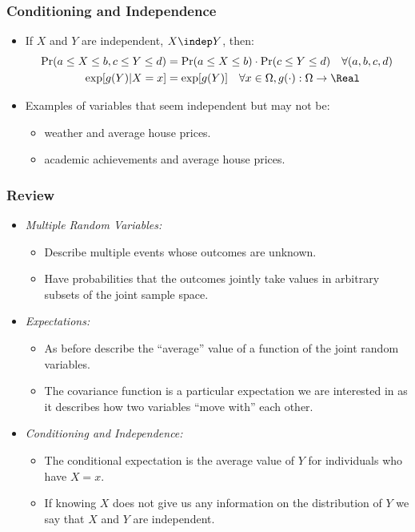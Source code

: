 \begin{frame}
\frametitle{Conditioning and Independence} 
\begin{itemize}
\item If $X$ and $Y$ are independent, $X\indep Y$, then:
\begin{align*}
\Pr(a\leq X\leq b, c\leq Y\leq d) 
  & = \Pr(a\leq X\leq b) \cdot \Pr(c\leq Y\leq d) \quad \forall (a,b,c,d)\\
\exp[g(Y)|X=x] 
  & = \exp[g(Y)] \quad \forall x\in\Omega, g(\cdot):\Omega\to\Real
\end{align*}
\item Examples of variables that seem independent but may not be:
\begin{itemize}
\item weather and average house prices.
\item academic achievements and average house prices.
\end{itemize}
\end{itemize}
\end{frame}


\begin{frame}
\frametitle{Review} 
\begin{itemize}
\item \emph{Multiple Random Variables:}
\begin{itemize}
\item Describe multiple events whose outcomes are unknown.
\item Have probabilities that the outcomes jointly take values in arbitrary subsets of the joint sample space.
\end{itemize}
\item \emph{Expectations:}
\begin{itemize}
\item As before describe the ``average'' value of a function of the joint random variables.
\item The covariance function is a particular expectation we are interested in as it describes how two variables ``move with'' each other.
\end{itemize}
\item \emph{Conditioning and Independence:}
\begin{itemize}
\item The conditional expectation is the average value of $Y$ for individuals who have $X=x$.
\item If knowing $X$ does not give us any information on the distribution of $Y$ we say that $X$ and $Y$ are independent.
\end{itemize}
\end{itemize}
\end{frame}

